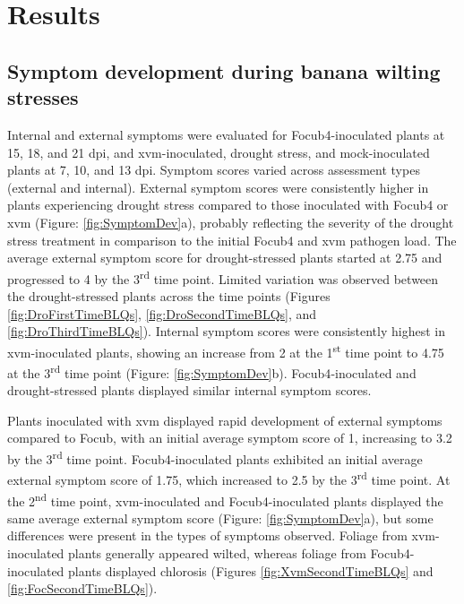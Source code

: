 \newpage
\section{Results}

\subsection{Symptom development during banana wilting stresses}

Internal and external symptoms were evaluated for \ac{Focub4}-inoculated plants at 15, 18, and 21 \ac{dpi}, and \ac{xvm}-inoculated, drought stress, and mock-inoculated plants at 7, 10, and 13 \ac{dpi}. Symptom scores varied across assessment types (external and internal). External symptom scores were consistently higher in plants experiencing drought stress compared to those inoculated with \ac{Focub4} or \ac{xvm} (Figure: \ref{fig:SymptomDev}a), probably reflecting the severity of the drought stress treatment in comparison to the initial \ac{Focub4} and \ac{xvm} pathogen load. The average external symptom score for drought-stressed plants started at 2.75 and progressed to 4 by the 3\textsuperscript{rd} time point. Limited variation was observed between the drought-stressed plants across the time points (Figures \ref{fig:DroFirstTimeBLQs}, \ref{fig:DroSecondTimeBLQs}, and \ref{fig:DroThirdTimeBLQs}). Internal symptom scores were consistently highest in \ac{xvm}-inoculated plants, showing an increase from 2 at the 1\textsuperscript{st} time point to 4.75 at the 3\textsuperscript{rd} time point (Figure: \ref{fig:SymptomDev}b). \Ac{Focub4}-inoculated and drought-stressed plants displayed similar internal symptom scores.

Plants inoculated with \ac{xvm} displayed rapid development of external symptoms compared to \ac{Focub}, with an initial average symptom score of 1, increasing to 3.2 by the 3\textsuperscript{rd} time point. \ac{Focub4}-inoculated plants exhibited an initial average external symptom score of 1.75, which increased to 2.5 by the 3\textsuperscript{rd} time point. At the 2\textsuperscript{nd} time point, \ac{xvm}-inoculated and \ac{Focub4}-inoculated plants displayed the same average external symptom score (Figure: \ref{fig:SymptomDev}a), but some differences were present in the types of symptoms observed. Foliage from \ac{xvm}-inoculated plants generally appeared wilted, whereas foliage from \ac{Focub4}-inoculated plants displayed chlorosis (Figures \ref{fig:XvmSecondTimeBLQs} and \ref{fig:FocSecondTimeBLQs}).
 
